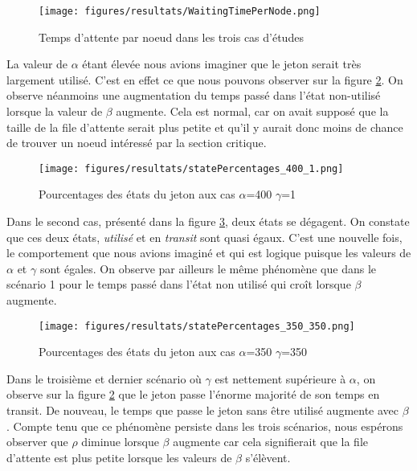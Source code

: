 \documentclass[12pt,a4paper]{article}
\begin{document}
\begin{figure}[h!]
    \centering
    \texttt{[image: figures/resultats/WaitingTimePerNode.png]}
    \caption{Temps d'attente par noeud dans les trois cas d'études}
    \label{fig:waitingTime}
\end{figure}

\pagebreak %

La valeur de $\alpha$ étant élevée nous avions imaginer que le jeton serait très largement utilisé. C'est en effet ce que nous pouvons observer sur la figure \ref{fig:statePercentages-400-1}. On observe néanmoins une augmentation du temps passé dans l'état
non-utilisé lorsque la valeur de $\beta$ augmente. Cela est normal, car on avait supposé que la taille de la file d'attente serait plus petite et qu'il y aurait donc moins de chance de trouver un noeud intéressé par la section critique.

\begin{figure}[h!]
    \centering
    \texttt{[image: figures/resultats/statePercentages\_400\_1.png]}
    \caption{Pourcentages des états du jeton aux cas $\alpha$=400 $\gamma$=1}
    \label{fig:statePercentages-400-1}
\end{figure}

Dans le second cas, présenté dans la figure \ref{fig:statePercentages-350-350}, deux états se dégagent. On constate que ces deux états, \textit{utilisé} et en \textit{transit} sont quasi égaux. C'est une nouvelle fois, le comportement que nous avions imaginé et qui est logique puisque les valeurs de $\alpha$ et $\gamma$ sont égales. On observe par ailleurs le même phénomène que dans le scénario 1 pour le temps passé dans l'état non utilisé qui croît lorsque $\beta$ augmente.

\begin{figure}[h!]
    \centering
    \texttt{[image: figures/resultats/statePercentages\_350\_350.png]}
    \caption{Pourcentages des états du jeton aux cas $\alpha$=350 $\gamma$=350}
    \label{fig:statePercentages-350-350}
\end{figure}

Dans le troisième et dernier scénario où $\gamma$ est nettement supérieure à $\alpha$, on observe sur la figure \ref{fig:statePercentages-400-1} que le jeton passe l'énorme majorité de son temps en transit. De nouveau, le temps que passe le jeton sans être utilisé augmente avec $\beta$. Compte tenu que ce phénomène persiste dans les trois scénarios, nous espérons observer que $\rho$ diminue lorsque $\beta$ augmente car cela signifierait que la file d'attente est plus petite lorsque les valeurs de $\beta$ s'élèvent. 
\end{document}
